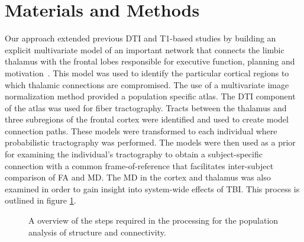 
\section{Materials and Methods}

Our approach extended previous DTI and T1-based studies by building an explicit multivariate model of an important network that connects the limbic thalamus with the frontal lobes responsible for executive function, planning and motivation~\cite{Cummings1993}. This model was used to identify the particular cortical regions to which thalamic connections are compromised.
The use of a multivariate image normalization method provided a population specific atlas. The DTI component of the atlas was used for fiber tractography. Tracts between the thalamus and three subregions of the frontal cortex were identified and used to create model connection paths. These models were transformed to each individual where probabilistic tractography was performed. The models were then used as a prior for examining the individual's tractography to obtain a subject-specific connection with a common frame-of-reference that facilitates inter-subject comparison of FA and MD. The MD in the cortex and thalamus was also examined in order to gain insight into system-wide effects of TBI. This process is outlined in figure \ref{fig:process}.

\begin{figure}
\caption{A overview of the steps required in the processing for
the population analysis of structure and connectivity.}
\label{fig:process}
\end{figure}

